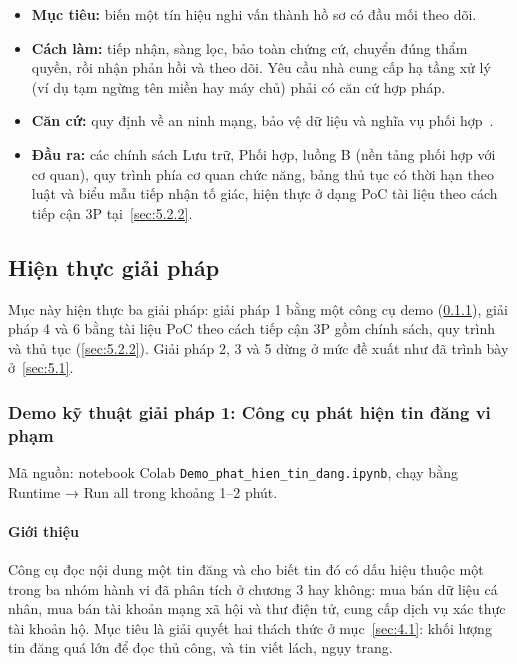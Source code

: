 \begin{itemize}
\item \textbf{Mục tiêu:} biến một tín hiệu nghi vấn thành hồ sơ có đầu mối theo dõi.
\item \textbf{Cách làm:} tiếp nhận, sàng lọc, bảo toàn chứng cứ, chuyển đúng thẩm quyền, rồi nhận phản hồi và theo dõi. Yêu cầu nhà cung cấp hạ tầng xử lý (ví dụ tạm ngừng tên miền hay máy chủ) phải có căn cứ hợp pháp.
\item \textbf{Căn cứ:} quy định về an ninh mạng, bảo vệ dữ liệu và nghĩa vụ phối hợp~\cite{luat-bvdlcn-2025,nd356-2025,luat-anm-2025,cuc-tmdt-2026,nd327-2026,nd333-2026}.
\item \textbf{Đầu ra:} các chính sách Lưu trữ, Phối hợp, luồng B (nền tảng phối hợp với cơ quan), quy trình phía cơ quan chức năng, bảng thủ tục có thời hạn theo luật và biểu mẫu tiếp nhận tố giác, hiện thực ở dạng PoC tài liệu theo cách tiếp cận 3P tại~\ref{sec:5.2.2}.
\end{itemize}
\subsection{Hiện thực giải pháp}\label{sec:5.2}

Mục này hiện thực ba giải pháp: giải pháp 1 bằng một công cụ demo (\ref{sec:5.2.1}), giải pháp 4 và 6 bằng tài liệu PoC theo cách tiếp cận 3P gồm chính sách, quy trình và thủ tục (\ref{sec:5.2.2}). Giải pháp 2, 3 và 5 dừng ở mức đề xuất như đã trình bày ở~\ref{sec:5.1}.

\subsubsection{Demo kỹ thuật giải pháp 1: Công cụ phát hiện tin đăng vi phạm}\label{sec:5.2.1}

Mã nguồn: notebook Colab \texttt{Demo\_\allowbreak{}phat\_\allowbreak{}hien\_\allowbreak{}tin\_\allowbreak{}dang.ipynb}, chạy bằng Runtime → Run all trong khoảng 1–2 phút.

\paragraph{Giới thiệu}

Công cụ đọc nội dung một tin đăng và cho biết tin đó có dấu hiệu thuộc một trong ba nhóm hành vi đã phân tích ở chương 3 hay không: mua bán dữ liệu cá nhân, mua bán tài khoản mạng xã hội và thư điện tử, cung cấp dịch vụ xác thực tài khoản hộ. Mục tiêu là giải quyết hai thách thức ở mục~\ref{sec:4.1}: khối lượng tin đăng quá lớn để đọc thủ công, và tin viết lách, ngụy trang.

